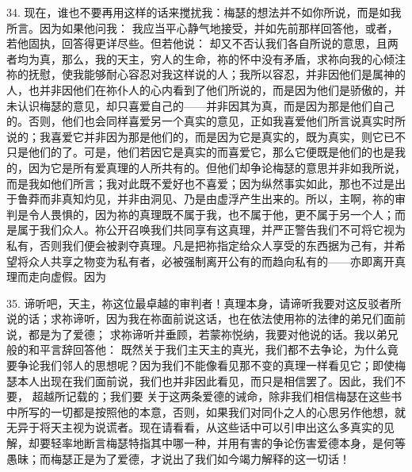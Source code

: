 34. 现在，谁也不要再用这样的话来搅扰我：梅瑟的想法并不如你所说，而是如我所言。因为如果他问我： 我应当平心静气地接受，并如先前那样回答他，或者，若他固执，回答得更详尽些。但若他说： 却又不否认我们各自所说的意思，且两者均为真，那么，我的天主，穷人的生命，祢的怀中没有矛盾，求祢向我的心倾注祢的抚慰，使我能够耐心容忍对我这样说的人；我所以容忍，并非因他们是属神的人，也并非因他们在祢仆人的心内看到了他们所说的，而是因为他们是骄傲的，并未认识梅瑟的意见，却只喜爱自己的——并非因其为真，而是因为那是他们自己的。否则，他们也会同样喜爱另一个真实的意见，正如我喜爱他们所言说真实时所说的；我喜爱它并非因为那是他们的，而是因为它是真实的，既为真实，则它已不只是他们的了。可是，他们若因它是真实的而喜爱它，那么它便既是他们的也是我的，因为它是所有爱真理的人所共有的。但他们却争论梅瑟的意思并非如我所说，而是我如他们所言；我对此既不爱好也不喜爱；因为纵然事实如此，那也不过是出于鲁莽而非真知灼见，并非由洞见、乃是由虚浮产生出来的。所以，主啊，祢的审判是令人畏惧的，因为祢的真理既不属于我，也不属于他，更不属于另一个人；而是属于我们众人。祢公开召唤我们共同享有这真理，并严正警告我们不可将它视为私有，否则我们便会被剥夺真理。凡是把祢指定给众人享受的东西据为己有，并希望将众人共享之物变为私有者，必被强制离开公有的而趋向私有的——亦即离开真理而走向虚假。因为  \par

35. 谛听吧，天主，祢这位最卓越的审判者！真理本身，请谛听我要对这反驳者所说的话；求祢谛听，因为我在祢面前说这话，也在依法使用祢的法律的弟兄们面前说，都是为了爱德； 求祢谛听并垂顾，若蒙祢悦纳，我要对他说的话。我以弟兄般的和平言辞回答他： 既然关于我们主天主的真光，我们都不去争论，为什么竟要争论我们邻人的思想呢？因为我们不能像看见那不变的真理一样看见它；即使梅瑟本人出现在我们面前说，我们也并非因此看见，而只是相信罢了。因此，我们不要， 超越所记载的；我们要  关于这两条爱德的诫命，除非我们相信梅瑟在这些书中所写的一切都是按照他的本意，否则，如果我们对同仆之人的心思另作他想，就无异于将天主视为说谎者。现在请看看，从这些话中可以引申出这么多真实的见解，却要轻率地断言梅瑟特指其中哪一种，并用有害的争论伤害爱德本身，是何等愚昧；而梅瑟正是为了爱德，才说出了我们如今竭力解释的这一切话！\par

